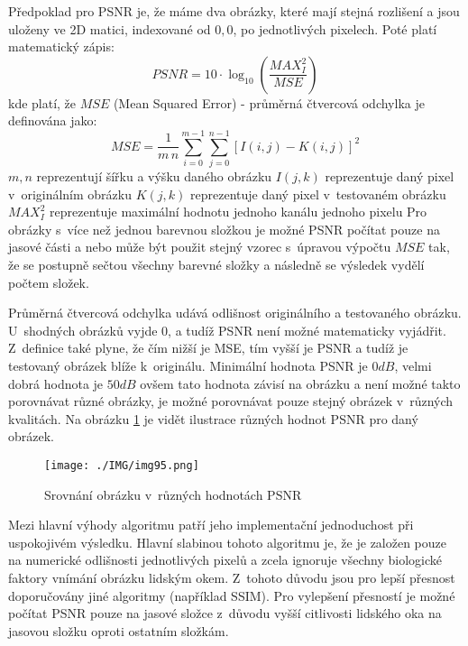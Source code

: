 \documentclass[thesis=M,czech]{FITthesis}[2016/06/26]
\begin{document}
Předpoklad pro PSNR je, že máme dva obrázky, které mají stejná rozlišení a jsou uloženy ve 2D matici, indexované od $0,0$,  po jednotlivých pixelech. \newline
Poté platí matematický zápis:
\begin{equation}
\mathit{PSNR} = 10 \cdot \log_{10} \left( \frac{\mathit{MAX}_I^2}{\mathit{MSE}} \right)
\end{equation}
kde platí, že $\mathit{MSE}$ (Mean Squared Error) - průměrná čtvercová odchylka je definována jako:
\begin{equation}
\mathit{MSE} = \frac{1}{m\,n}\sum_{i=0}^{m-1}\sum_{j=0}^{n-1} [I(i,j) - K(i,j)]^2
\end{equation}
$\mathit{m,n}$ reprezentují šířku a výšku daného obrázku \newline
$\mathit{I(j,k)}$ reprezentuje daný pixel v~originálním obrázku \newline
$\mathit{K(j,k)}$ reprezentuje daný pixel v~testovaném obrázku \newline
$\mathit{MAX}_I^2$ reprezentuje maximální hodnotu jednoho kanálu jednoho pixelu \newline
Pro obrázky s~více než jednou barevnou složkou je možné PSNR počítat pouze na jasové části a nebo může být použit stejný vzorec s~úpravou výpočtu $\mathit{MSE}$ tak, že se postupně sečtou všechny barevné složky a následně se výsledek vydělí počtem složek\cite{PSNR2}.

Průměrná čtvercová odchylka udává odlišnost originálního a testovaného obrázku. U~shodných obrázků vyjde 0, a tudíž PSNR není možné matematicky vyjádřit. Z~definice také plyne, že čím nižší je MSE, tím vyšší je PSNR a tudíž je testovaný obrázek blíže k~originálu. Minimální hodnota PSNR je $0 \mathit{dB}$, velmi dobrá hodnota je $50 \mathit{dB}$\cite{50PSNR} ovšem tato hodnota závisí na obrázku a není možné takto porovnávat různé obrázky, je možné porovnávat pouze stejný obrázek v~různých kvalitách\cite{PSNR3}. Na obrázku \ref{fig:PSNR_image} je vidět ilustrace různých hodnot PSNR pro daný obrázek. 
\begin{figure}[h]\centering
\texttt{[image: ./IMG/img95.png]}
\caption{Srovnání obrázku v~různých hodnotách PSNR}
\label{fig:PSNR_image}
\end{figure}

Mezi hlavní výhody algoritmu patří jeho implementační jednoduchost při uspokojivém výsledku. Hlavní slabinou tohoto algoritmu je, že je založen pouze na numerické odlišnosti jednotlivých pixelů a zcela ignoruje všechny biologické faktory vnímání obrázku lidským okem.  Z~tohoto důvodu jsou pro lepší přesnost doporučovány jiné algoritmy (například SSIM). Pro vylepšení přesností je možné počítat PSNR pouze na jasové složce z~důvodu vyšší citlivosti lidského oka na jasovou složku oproti ostatním složkám.
\end{document}
